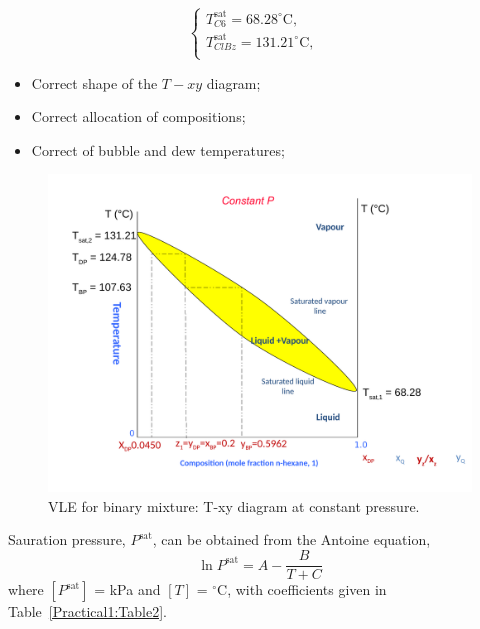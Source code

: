 \documentclass[calculator,allquestions,datasheet,solutions]{exam_newMarcus2}
\newcommand{\frc}{\displaystyle\frac}
\begin{document}
\begin{question}
\begin{enumerate}[a)]
{\begin{displaymath}
                                    \begin{cases}
                                      T^{\text{sat}}_{C6}= 68.28^{\circ}\text{C}, &\\
                                      T^{\text{sat}}_{ClBz}= 131.21^{\circ}\text{C}, &\\                                      
                                    \end{cases}
                                  \end{displaymath}
                                  \begin{itemize}
                                     \item Correct shape of the $T-xy$ diagram;~
                                     \item Correct allocation of compositions;~
                                     \item Correct of bubble and dew temperatures;~
                                  \end{itemize}

      \begin{figure}[h]
        \begin{center}
          \includegraphics[width=.8\linewidth,clip]{./Pics/VLE_Txy_Diagram}
          \caption{VLE for binary mixture: T-xy diagram at constant pressure.}\label{Figure:Fig1}
        \end{center}
        \end{figure} 
                  }
         \end{enumerate}

         Sauration pressure, $P^{\text{sat}}$, can be obtained from the Antoine equation,
          \begin{displaymath}
            \ln{P^{\text{sat}}} = A - \frc{B}{T+C}
          \end{displaymath}
          where $\left[P^{\text{sat}}\right]$ = kPa and $[T]$ = $^{\circ}$C, with coefficients given in Table~\ref{Practical1:Table2}.
           


\end{question}
\end{document}
